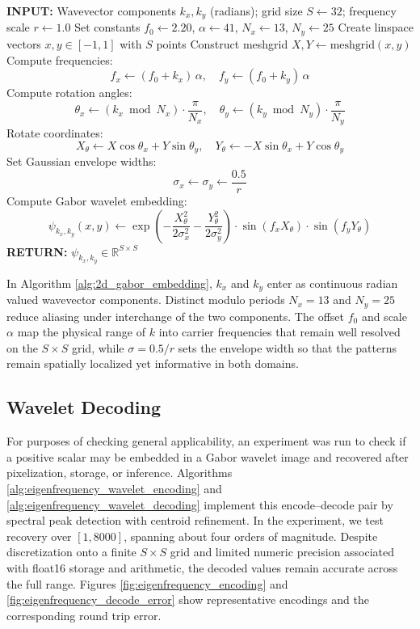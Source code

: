 \documentclass[preprint,review,12pt,numafflabel]{elsarticle}
\begin{document}
\begin{algorithm}[H]
\caption{2D Gabor Wavelet Embedding for Wavevectors}
\label{alg:2d_gabor_embedding}
\begin{algorithmic}[1]
\STATE \textbf{INPUT:} Wavevector components \( k_x, k_y \) (radians); grid size \( S \leftarrow 32 \); frequency scale \( r \leftarrow 1.0 \)
\STATE Set constants \( f_0 \leftarrow 2.20 \), \( \alpha \leftarrow 41 \), \( N_x \leftarrow 13 \), \( N_y \leftarrow 25 \)
\STATE Create linspace vectors \( x, y \in [-1, 1] \) with \( S \) points
\STATE Construct meshgrid \( X, Y \leftarrow \text{meshgrid}(x, y) \)
\STATE Compute frequencies:
\[
f_x \leftarrow (f_0 + k_x)\,\alpha, \quad f_y \leftarrow (f_0 + k_y)\,\alpha
\]
\STATE Compute rotation angles:
\[
\theta_x \leftarrow (k_x \bmod N_x) \cdot \frac{\pi}{N_x}, \quad \theta_y \leftarrow (k_y \bmod N_y) \cdot \frac{\pi}{N_y}
\]
\STATE Rotate coordinates:
\[
X_\theta \leftarrow X \cos \theta_x + Y \sin \theta_y, \quad
Y_\theta \leftarrow -X \sin \theta_x + Y \cos \theta_y
\]
\STATE Set Gaussian envelope widths:
\[
\sigma_x \leftarrow \sigma_y \leftarrow \frac{0.5}{r}
\]
\STATE Compute Gabor wavelet embedding:
\[
\psi_{k_x, k_y}(x, y) \leftarrow
\exp\left(-\frac{X_\theta^2}{2 \sigma_x^2} - \frac{Y_\theta^2}{2 \sigma_y^2}\right)
\cdot \sin(f_x X_\theta) \cdot \sin(f_y Y_\theta)
\]
\STATE \textbf{RETURN:} \( \psi_{k_x, k_y} \in \mathbb{R}^{S \times S} \)
\end{algorithmic}
\end{algorithm}

In Algorithm \ref{alg:2d_gabor_embedding}, \(k_x\) and \(k_y\) enter as continuous radian valued wavevector components. Distinct modulo periods \(N_x=13\) and \(N_y=25\) reduce aliasing under interchange of the two components. The offset \(f_0\) and scale \(\alpha\) map the physical range of \(k\) into carrier frequencies that remain well resolved on the \(S\times S\) grid, while \(\sigma=0.5/r\) sets the envelope width so that the patterns remain spatially localized yet informative in both domains.

\subsection{Wavelet Decoding}
\label{ssec:wavelet_decoding}
For purposes of checking general applicability, an experiment was run to check if a positive scalar may be embedded in a Gabor wavelet image and recovered after pixelization, storage, or inference. Algorithms \ref{alg:eigenfrequency_wavelet_encoding} and \ref{alg:eigenfrequency_wavelet_decoding} implement this encode--decode pair by spectral peak detection with centroid refinement. In the experiment, we test recovery over \([1,8000]\), spanning about four orders of magnitude. Despite discretization onto a finite \(S\times S\) grid and limited numeric precision associated with float16 storage and arithmetic, the decoded values remain accurate across the full range. Figures \ref{fig:eigenfrequency_encoding} and \ref{fig:eigenfrequency_decode_error} show representative encodings and the corresponding round trip error.
\end{document}
